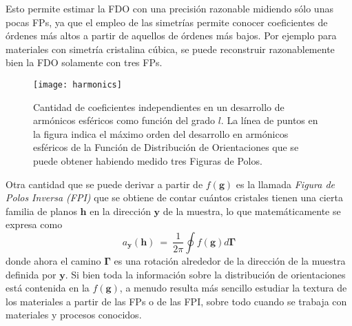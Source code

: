 Esto permite estimar la FDO con una precisión razonable midiendo sólo unas pocas FPs, ya que el empleo de las simetrías permite conocer coeficientes de órdenes más altos a partir de aquellos de órdenes más bajos. 
Por ejemplo para materiales con simetría cristalina cúbica, se puede reconstruir razonablemente bien la FDO solamente con tres FPs.
\begin{figure}[!htb]
  \centering
  \texttt{[image: harmonics]}
  \caption{Cantidad de coeficientes independientes en un desarrollo de armónicos esféricos como función del grado $l$. La línea de puntos en la figura indica el máximo orden del desarrollo en armónicos esféricos de la Función de Distribución de Orientaciones que se puede obtener habiendo medido tres Figuras de Polos.}
  \label{fig:harmonics}
\end{figure}

Otra cantidad que se puede derivar a partir de $f(\mathbf{g})$ es la llamada \textit{Figura de Polos Inversa (FPI)} que se obtiene de contar cuántos cristales tienen una cierta familia de planos $\mathbf{h}$ en la dirección $\mathbf{y}$ de la muestra, lo que matemáticamente se expresa como
\begin{equation}
  a_{\mathbf{y}}(\mathbf{h}) \ = \ \frac{1}{2 \pi} \oint f(\mathbf{g}) d\mathbf{\Gamma}
  \label{eq:IPF}
\end{equation}
\noindent
donde ahora el camino $\mathbf{\Gamma}$ es una rotación alrededor de la dirección de la muestra definida por $\mathbf{y}$.
Si bien toda la información sobre la distribución de orientaciones está contenida en la $f(\mathbf{g})$, a menudo resulta más sencillo estudiar la textura de los materiales a partir de las FPs o de las FPI, sobre todo cuando se trabaja con materiales y procesos conocidos.

